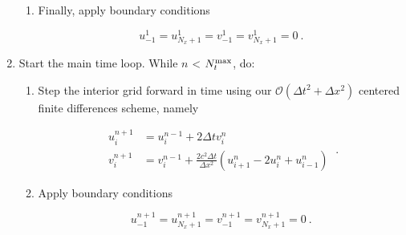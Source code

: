 \documentclass[a4paper,11pt]{article}
\begin{document}
\begin{enumerate}
\begin{enumerate}
    \item Finally, apply boundary conditions

\begin{equation}
\boxed{u^{1}_{-1} = u^{1}_{N_{x}+1} = v^{1}_{-1} = v^{1}_{N_{x}+1} = 0}\ .
\end{equation}
\end{enumerate}

\item Start the main time loop. While $n$ < $N_{t}^{\rm max}$, do:
  \begin{enumerate}
  
    \item Step the interior grid forward in time using our $\mathcal{O}\left(\Delta t^{2} + \Delta x^{2}\right)$ centered finite differences scheme, namely

\begin{equation}
\boxed{
\begin{aligned}
u^{n+1}_{i} &= u^{n-1}_{i} + 2\Delta t v^{n}_{i}\\
v^{n+1}_{i} &= v^{n-1}_{i} + \frac{2c^{2}\Delta t}{\Delta x^{2}}\left(u^{n}_{i+1}-2u^{n}_{i}+u^{n}_{i-1}\right)
\end{aligned}
}\ .
\end{equation}

    \item Apply boundary conditions

\begin{equation}
\boxed{u^{n+1}_{-1} = u^{n+1}_{N_{x}+1} = v^{n+1}_{-1} = v^{n+1}_{N_{x}+1} = 0}\ .
\end{equation}
  \end{enumerate}
\end{enumerate}
\end{document}

